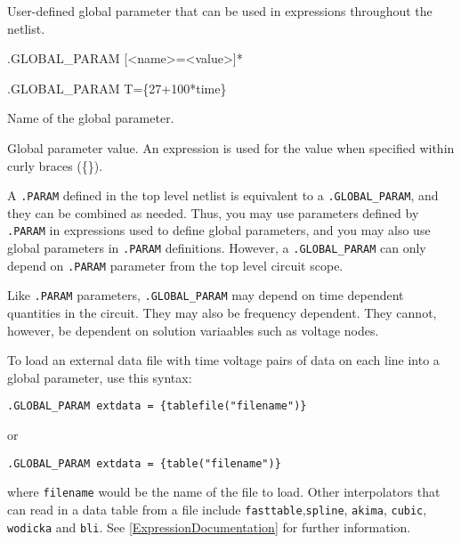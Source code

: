 

User-defined global parameter that can be used in expressions throughout the netlist.
\begin{Command}

\format
.GLOBAL\_PARAM [<name>=<value>]*

\examples
.GLOBAL\_PARAM T=\{27+100*time\}

\begin{Arguments}
Name of the global parameter.

Global parameter value.  An expression is used for the value when specified within curly braces (\{\}).

\end{Arguments}

\comments

A \texttt{.PARAM} 
defined in the top level netlist is equivalent to 
a \texttt{.GLOBAL\_PARAM}, and they can be combined as needed.
Thus, you may use parameters defined by \texttt{.PARAM} in expressions used to
define global parameters, and you may also use global parameters in
\texttt{.PARAM} definitions.    However, a \texttt{.GLOBAL\_PARAM} 
  can only depend on \texttt{.PARAM} parameter from the top level circuit scope.

Like \texttt{.PARAM} parameters, \texttt{.GLOBAL\_PARAM} may
depend on time dependent quantities in the circuit.  They may also
be frequency dependent.  They cannot, however, be 
dependent on solution variaables such as voltage nodes.

To load an external data file with time voltage pairs of data on each 
line into a global parameter, use this syntax:

\texttt{.GLOBAL\_PARAM extdata = \{tablefile("filename")\}}

or

\texttt{.GLOBAL\_PARAM extdata = \{table("filename")\}}

where \texttt{filename} would be the name of the file to load.  
Other interpolators that can read in a data table from a file 
include \texttt{fasttable},\texttt{spline}, \texttt{akima}, \texttt{cubic}, 
\texttt{wodicka} and \texttt{bli}.  See \ref{ExpressionDocumentation} 
for further information. 


\end{Command}
